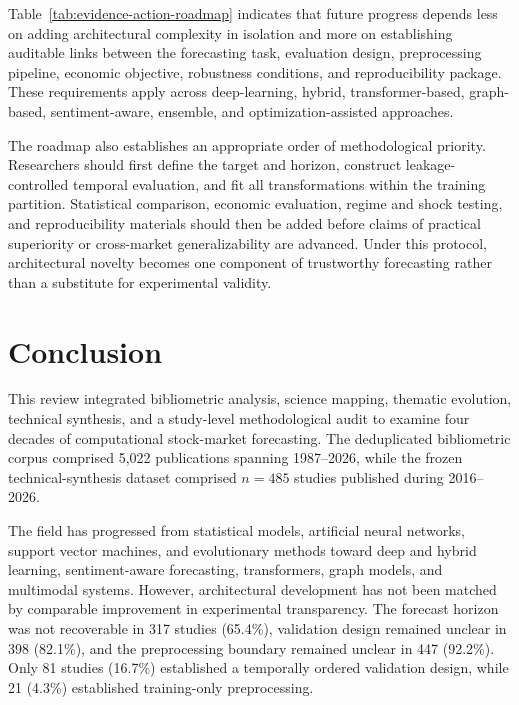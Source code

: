 \documentclass[pdflatex,sn-mathphys-num]{sn-jnl}%
\theoremstyle{thmstyleone}%
\theoremstyle{thmstyletwo}%
\theoremstyle{thmstylethree}%
\begin{document}
\FloatBarrier

Table~\ref{tab:evidence-action-roadmap} indicates that future progress
depends less on adding architectural complexity in isolation and more on
establishing auditable links between the forecasting task, evaluation
design, preprocessing pipeline, economic objective, robustness
conditions, and reproducibility package. These requirements apply across
deep-learning, hybrid, transformer-based, graph-based, sentiment-aware,
ensemble, and optimization-assisted approaches.

The roadmap also establishes an appropriate order of methodological
priority. Researchers should first define the target and horizon,
construct leakage-controlled temporal evaluation, and fit all
transformations within the training partition. Statistical comparison,
economic evaluation, regime and shock testing, and reproducibility
materials should then be added before claims of practical superiority or
cross-market generalizability are advanced. Under this protocol,
architectural novelty becomes one component of trustworthy forecasting
rather than a substitute for experimental validity.

\section{Conclusion}
\label{sec:conclusion}

This review integrated bibliometric analysis, science mapping, thematic
evolution, technical synthesis, and a study-level methodological audit to
examine four decades of computational stock-market forecasting. The
deduplicated bibliometric corpus comprised 5,022 publications spanning
1987--2026, while the frozen technical-synthesis dataset comprised
\(n=485\) studies published during 2016--2026.

The field has progressed from statistical models, artificial neural
networks, support vector machines, and evolutionary methods toward deep and
hybrid learning, sentiment-aware forecasting, transformers, graph models,
and multimodal systems. However, architectural development has not been
matched by comparable improvement in experimental transparency. The forecast
horizon was not recoverable in 317 studies (65.4\%), validation design
remained unclear in 398 (82.1\%), and the preprocessing boundary remained
unclear in 447 (92.2\%). Only 81 studies (16.7\%) established a temporally
ordered validation design, while 21 (4.3\%) established training-only
preprocessing.
\end{document}
